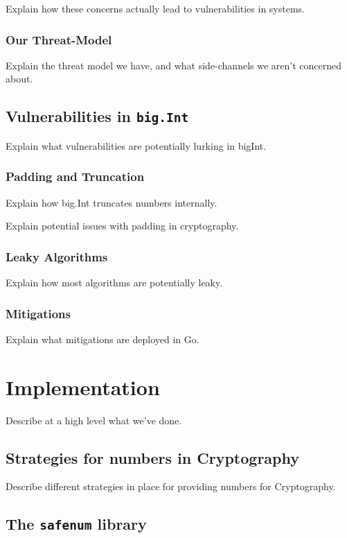 \documentclass[11pt, a4paper, twocolumn]{article} %
\begin{document}
{Explain how these concerns actually lead to vulnerabilities in systems.

\subsubsection{Our Threat-Model}

Explain the threat model we have, and what side-channels we aren't concerned
about.

\subsection{Vulnerabilities in \texttt{big.Int}}

Explain what vulnerabilities are potentially lurking in bigInt.

\subsubsection{Padding and Truncation}

Explain how big.Int truncates numbers internally.

Explain potential issues with padding in cryptography.

\subsubsection{Leaky Algorithms}

Explain how most algorithms are potentially leaky.

\subsubsection{Mitigations}

Explain what mitigations are deployed in Go.

\section{Implementation}

Describe at a high level what we've done.

\subsection{Strategies for numbers in Cryptography}

Describe different strategies in place for providing numbers for
Cryptography.

\subsection{The \texttt{safenum} library}

}
\end{document}
